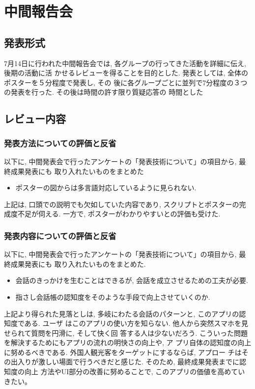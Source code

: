 \documentclass[openany,11pt,papersize]{jsbook}
\begin{document}
\chapter{中間報告会}

\section{発表形式}
7月14日に行われた中間報告会では, 各グループの行ってきた活動を詳細に伝え, 後期の活動に活
かせるレビューを得ることを目的とした. 発表としては, 全体のポスターを５分程度で発表し, その
後に各グループごとに並列で7分程度の３つの発表を行った. その後は時間の許す限り質疑応答の
時間とした

\section{レビュー内容}
\subsection{発表方法についての評価と反省}
以下に, 中間発表会で行ったアンケートの「発表技術について」の項目から, 最終成果発表にも
取り入れたいものをまとめた
\begin{itemize}
 \item ポスターの図からは多言語対応しているように見られない.
\end{itemize}
上記は, 口頭での説明でも欠如していた内容であり, スクリプトとポスターの完成度不足が伺える.
一方で, ポスターがわかりやすいとの評価も受けた.
\subsection{発表内容についての評価と反省}
以下に, 中間発表会で行ったアンケートの「発表技術について」の項目から, 最終成果発表にも
取り入れたいものをまとめた.
\begin{itemize}
 \item 会話のきっかけを生むことはできるが, 会話を成立させるための工夫が必要.
 \item 指さし会話帳の認知度をそのような手段で向上させていくのか.
\end{itemize}
上記より得られた見落としは, 多岐にわたる会話のパターンと, このアプリの認知度である. ユーザ
はこのアプリの使い方を知らない. 他人から突然スマホを見せられて質問を円滑に, そして快く回
答する人は少ないだろう. こういった問題を解決するためにもアプリの流れの明快さの向上や, ア
プリ自体の認知度の向上に努めるべきである. 外国人観光客をターゲットにするならば, アプロー
チはその出入りが激しい場面で行うべきだと感じた. そのため, 最終成果発表までに認知度の向上
方法やUI部分の改善に努めることで, このアプリの価値を高めていきたい。
\end{document}
